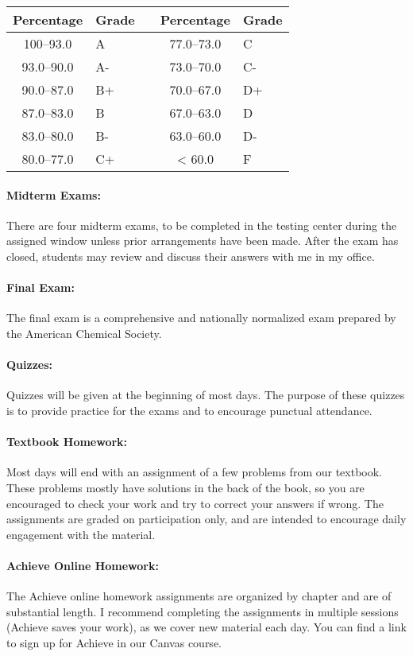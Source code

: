 \documentclass[12pt, letterpaper]{article}
\begin{document}
\begin{tabular}{cl|c|cl}
	Percentage & Grade &  & Percentage & Grade \\ \midrule
	100--93.0  & A     &  & 77.0--73.0 & C     \\
	93.0--90.0 & A-    &  & 73.0--70.0 & C-    \\
	90.0--87.0 & B+    &  & 70.0--67.0 & D+    \\
	87.0--83.0 & B     &  & 67.0--63.0 & D     \\
	83.0--80.0 & B-    &  & 63.0--60.0 & D-    \\
	80.0--77.0 & C+    &  & < 60.0     & F
\end{tabular}
\paragraph{Midterm Exams:}
There are four midterm exams, to be completed in the testing center during the assigned window unless prior arrangements have been made. After the exam has closed, students may review and discuss their answers with me in my office.

\paragraph{Final Exam:}
The final exam is a comprehensive and nationally normalized exam prepared by the American Chemical Society.

\paragraph{Quizzes:}
Quizzes will be given at the beginning of most days. The purpose of these quizzes is to provide practice for the exams and to encourage punctual attendance.

\paragraph{Textbook Homework:}
Most days will end with an assignment of a few problems from our textbook. These problems mostly have solutions in the back of the book, so you are encouraged to check your work and try to correct your answers if wrong. The assignments are graded on participation only, and are intended to encourage daily engagement with the material.

\paragraph{Achieve Online Homework:}
The Achieve online homework assignments are organized by chapter and are of substantial length. I recommend completing the assignments in multiple sessions (Achieve saves your work), as we cover new material each day. You can find a link to sign up for Achieve in our Canvas course.
\end{document}

